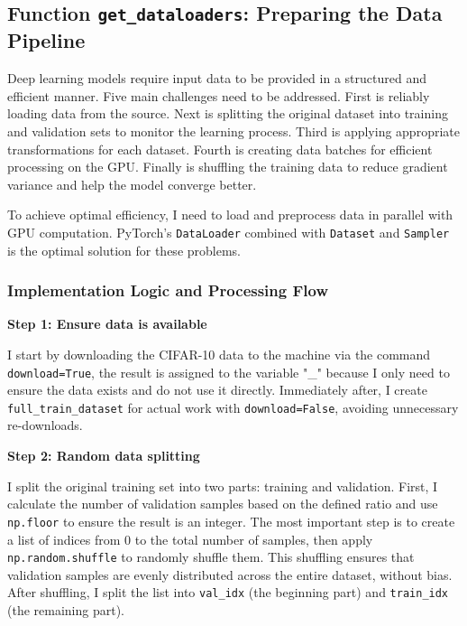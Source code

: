 \documentclass[12pt, a4paper, openany]{report}
\begin{document}
 \subsection{Function \texttt{get\_dataloaders}: Preparing the Data Pipeline} %
 Deep learning models require input data to be provided in a structured and efficient manner. Five main challenges need to be addressed. First is reliably loading data from the source. Next is splitting the original dataset into training and validation sets to monitor the learning process. Third is applying appropriate transformations for each dataset. Fourth is creating data batches for efficient processing on the GPU. Finally is shuffling the training data to reduce gradient variance and help the model converge better.

 To achieve optimal efficiency, I need to load and preprocess data in parallel with GPU computation. PyTorch's \texttt{DataLoader} combined with \texttt{Dataset} and \texttt{Sampler} is the optimal solution for these problems.

 \subsubsection*{Implementation Logic and Processing Flow} %
 \noindent\textbf{Step 1: Ensure data is available} %

 I start by downloading the CIFAR-10 data to the machine via the command \texttt{download=True}, the result is assigned to the variable "\_" because I only need to ensure the data exists and do not use it directly. Immediately after, I create \texttt{full\_train\_dataset} for actual work with \texttt{download=False}, avoiding unnecessary re-downloads. %

 \noindent\textbf{Step 2: Random data splitting} %

 I split the original training set into two parts: training and validation. First, I calculate the number of validation samples based on the defined ratio and use \texttt{np.floor} to ensure the result is an integer.
 The most important step is to create a list of indices from 0 to the total number of samples, then apply \texttt{np.random.shuffle} to randomly shuffle them. This shuffling ensures that validation samples are evenly distributed across the entire dataset, without bias. After shuffling, I split the list into \texttt{val\_idx} (the beginning part) and \texttt{train\_idx} (the remaining part). %
\end{document}
